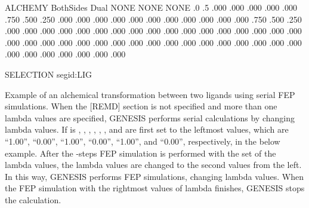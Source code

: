 \documentclass[a4paper,11pt,oneside,english]{sphinxmanual}
\begin{document}
\begin{sphinxVerbatim}[commandchars=\\\{\}]
\PYG{o}{[}ALCHEMY\PYG{o}{]}
  BothSides
   Dual
        NONE
        NONE
          
          NONE
  
     
       .0
        .5
        .000 .000 .000 .000 .000 .750 .500 .250 .000
        .000 .000 .000 .000 .000 .000 .000 .000 .000
        .000 .750 .500 .250 .000 .000 .000 .000 .000
        .000 .000 .000 .000 .000 .000 .000 .000 .000
      .000 .000 .000 .000 .000 .000 .000 .000 .000
      .000 .000 .000 .000 .000 .000 .000 .000 .000
       .000 .000 .000 .000 .000 .000 .000 .000 .000

\PYG{o}{[}SELECTION\PYG{o}{]}
  segid:LIG
\end{sphinxVerbatim}

Example of an alchemical transformation between two ligands using serial FEP simulations.
When the {[}REMD{]} section is not specified and more than one lambda values are specified,
GENESIS performs serial calculations by changing lambda values.
If  is , , , , , ,
and  are first set to the leftmost values,
which are “1.00”, “0.00”, “1.00”, “0.00”, “1.00”, and “0.00”, respectively, in the below example.
After the -steps FEP simulation is performed with the set of the lambda values, the lambda values are changed to the second values from the left.
In this way, GENESIS performs FEP simulations, changing lambda values.
When the FEP simulation with the rightmost values of lambda finishes, GENESIS stops the calculation.
\end{document}
